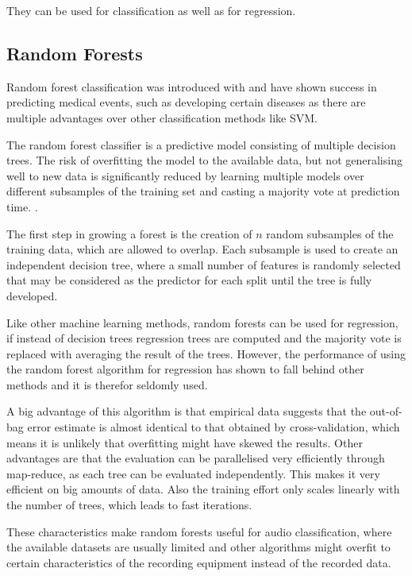 They can be used for classification as well as for regression.





\subsection{Random Forests}


Random forest classification was introduced with \cite{Breiman2001} and have shown success in predicting medical events, such as developing certain diseases as there are multiple advantages over other classification methods like SVM.

The random forest classifier is a predictive model consisting of multiple decision trees. The risk of overfitting the model to the available data, but not generalising well to new data is significantly reduced by learning multiple models over different subsamples of the training set and casting a majority vote at prediction time. \cite{statisticallearning}.

The first step in growing a forest is the creation of $n$ random subsamples of the training data, which are allowed to overlap. Each subsample is used to create an independent decision tree, where a small number of features is randomly selected that may be considered as the predictor for each split until the tree is fully developed.

Like other machine learning methods, random forests can be used for regression, if instead of decision trees regression trees are computed and the majority vote is replaced with averaging the result of the trees. However, the performance of using the random forest algorithm for regression has shown to fall behind other methods and it is therefor seldomly used.

A big advantage of this algorithm is that empirical data suggests that the out-of-bag error estimate is almost identical to that obtained by cross-validation, which means it is unlikely that overfitting might have skewed the results. Other advantages are that the evaluation can be parallelised very efficiently through map-reduce, as each tree can be evaluated independently. This makes it very efficient on big amounts of data. Also the training effort only scales linearly with the number of trees, which leads to fast iterations.

These characteristics make random forests useful for audio classification, where the available datasets are usually limited and other algorithms might overfit to certain characteristics of the recording equipment instead of the recorded data.

